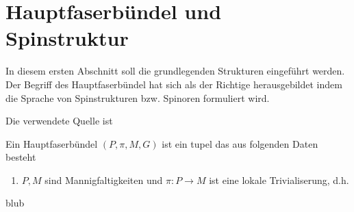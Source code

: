 




%
\section{Hauptfaserbündel und Spinstruktur}

In diesem ersten Abschnitt soll die grundlegenden Strukturen eingeführt 
werden. Der Begriff des Hauptfaserbündel hat sich als der Richtige
herausgebildet indem die Sprache von Spinstrukturen bzw. Spinoren
formuliert wird.

Die verwendete Quelle ist \cite{baum09}

\begin{Def}[Hauptfaserbündel]
	Ein \textsf{Hauptfaserbündel} $(P,\pi,M,G)$ ist ein tupel das
	aus folgenden Daten besteht
	\begin{enumerate}
		\item $P,M$ sind Mannigfaltigkeiten und $\pi : P \rightarrow M$ ist eine lokale Trivialiserung, d.h. 
	\end{enumerate}		
\end{Def}

\begin{Bsp}
	blub%
\end{Bsp}

